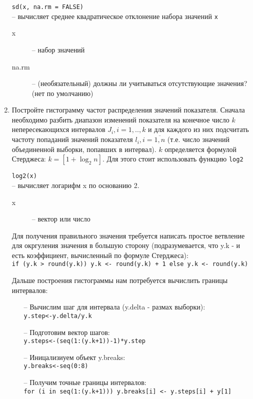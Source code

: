 \begin{enumerate}
\begin{mdframed}[style=BadassFrame]
              \texttt{sd(x, na.rm = FALSE)} \\
              	-- вычисляет среднее квадратическое отклонение набора значений \texttt{x}
              \begin{description}

                \item[x] -- набор значений
                \item[na.rm] -- (необязательный) должны ли учитываться отсутствующие значения? (нет по умолчанию)
              \end{description}
        \end{mdframed}

	\item Постройте гистограмму частот распределения значений показателя.
		Сначала необходимо разбить диапазон изменений показателя на конечное число $k$
		непересекающихся интервалов $J_{i}, i=1,..,k$  и для каждого из них 
		подсчитать частоту попаданий значений показателя $l_{i}, i=\overline{1,n}$
		(т.е. число значений объединенной выборки, попавших в интервал).
		$k$ определяется формулой Стерджеса: $k=[1+\log_2 n]$.
		Для этого стоит использовать функцию \texttt{log2}

		\begin{mdframed}[style=BadassFrame]
			\texttt{log2(x)} \\
				-- вычисляет логарифм x по основанию 2.
			\begin{description}

				\item[x] -- вектор или число
			\end{description}
		\end{mdframed}

		Для получения правильного значения требуется написать простое ветвление для окргуления значения в большую сторону
		(подразумевается, что y.k - и есть коэффициент, вычисленный по формуле Стерджеса):\\
		\texttt{if (y.k > round(y.k)) y.k <- round(y.k) + 1 else y.k <- round(y.k)}
		
		Дальше построения гистограммы нам потребуется вычислить границы интервалов:
		\begin{itemize}
			\item[--] Вычислим шаг для интервала (y.delta - размах выборки):\\
				\texttt{y.step<-y.delta/y.k}
			\item[--] Подготовим вектор шагов:\\
				\texttt{y.steps<-(seq(1:(y.k+1))-1)*y.step}
			\item[--] Иницализиуем объект y.breaks:\\
				\texttt{y.breaks<-seq(0:8)}
			\item[--] Получим точные границы интервалов:\\
				\texttt{for (i in seq(1:(y.k+1))) y.breaks[i] <- y.steps[i] + y[1]}
		\end{itemize}


\end{enumerate}
